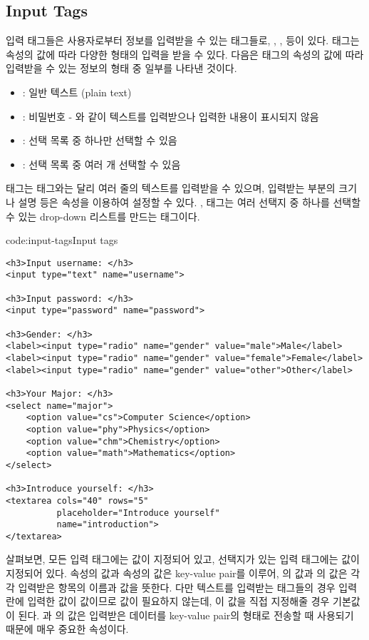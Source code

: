\subsection*{Input Tags}
입력 태그들은 사용자로부터 정보를 입력받을 수 있는 태그들로, , ,  등이 있다.  태그는  속성의 값에 따라 다양한 형태의 입력을 받을 수 있다. 다음은  태그의  속성의 값에 따라 입력받을 수 있는 정보의 형태 중 일부를 나타낸 것이다.

\begin{itemize}
    \item {}: 일반 텍스트 (plain text)
    \item {}: 비밀번호 - 와 같이 텍스트를 입력받으나 입력한 내용이 표시되지 않음
    \item {}: 선택 목록 중 하나만 선택할 수 있음
    \item {}: 선택 목록 중 여러 개 선택할 수 있음
\end{itemize}

 태그는  태그와는 달리 여러 줄의 텍스트를 입력받을 수 있으며, 입력받는 부분의 크기나 설명 등은 속성을 이용하여 설정할 수 있다. ,  태그는 여러 선택지 중 하나를 선택할 수 있는 drop-down 리스트를 만드는 태그이다.

\begin{code}{code:input-tags}{Input tags}
\begin{verbatim}
<h3>Input username: </h3>
<input type="text" name="username">

<h3>Input password: </h3>
<input type="password" name="password">

<h3>Gender: </h3>
<label><input type="radio" name="gender" value="male">Male</label>
<label><input type="radio" name="gender" value="female">Female</label>
<label><input type="radio" name="gender" value="other">Other</label>

<h3>Your Major: </h3>
<select name="major">
    <option value="cs">Computer Science</option>
    <option value="phy">Physics</option>
    <option value="chm">Chemistry</option>
    <option value="math">Mathematics</option>
</select>

<h3>Introduce yourself: </h3>
<textarea cols="40" rows="5"
          placeholder="Introduce yourself"
          name="introduction">
</textarea>
\end{verbatim}
\end{code}

\를 살펴보면, 모든 입력 태그에는  값이 지정되어 있고, 선택지가 있는 입력 태그에는  값이 지정되어 있다.  속성의 값과  속성의 값은 key-value pair를 이루어, 의 값과 의 값은 각각 입력받은 항목의 이름과 값을 뜻한다. 다만 텍스트를 입력받는 태그들의 경우 입력란에 입력한 값이  값이므로  값이 필요하지 않는데, 이 값을 직접 지정해줄 경우 기본값이 된다. 과 의 값은 입력받은 데이터를 key-value pair의 형태로 전송할 때 사용되기 때문에 매우 중요한 속성이다.

